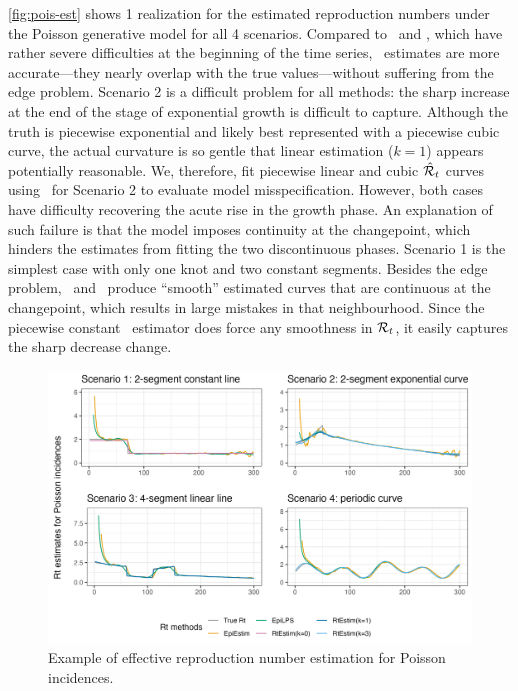 \autoref{fig:pois-est} shows 1 realization for the estimated reproduction
numbers under the Poisson generative model for all 4 scenarios. Compared to
\EpiEstim\ and \EpiLPS, which have rather severe difficulties at the beginning
of the time series, \RtEstim\ estimates are more accurate---they nearly overlap
with the true values---without suffering from the edge problem. Scenario 2 is a
difficult problem for all methods: the sharp increase at the end of the stage of
exponential growth is difficult to capture. Although the truth is piecewise
exponential and likely best represented with a piecewise cubic curve, the actual
curvature is so gentle that linear estimation ($k=1$) appears potentially
reasonable. We, therefore, fit piecewise linear and cubic $\hat{\mathcal{R}}_t$ curves
using \RtEstim\ for Scenario 2 to evaluate model misspecification. However, both
cases have difficulty recovering the acute rise in the growth phase. An
explanation of such failure is that the model imposes continuity at the
changepoint, which hinders the estimates from fitting the two discontinuous
phases. Scenario 1 is the simplest case with only one knot and two constant
segments. Besides the edge problem, \EpiEstim\ and \EpiLPS\ produce ``smooth''
estimated curves that are continuous at the changepoint, which results in
large mistakes in that neighbourhood. Since the
piecewise constant \RtEstim\ estimator does force any smoothness in
$\mathcal{R}_t$, it easily captures the sharp decrease change. 

\begin{figure}[tb]
    \centering
    \includegraphics[width=.99\textwidth]{fig/Pois-res-plot.png}
    \caption{Example of effective reproduction number estimation for Poisson incidences.}
    \label{fig:pois-est}
\end{figure}


